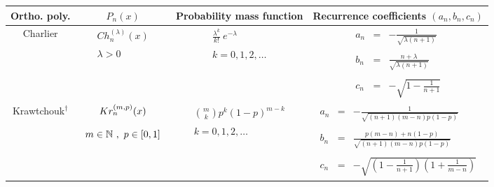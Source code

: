 {  \begin{center}

    \begin{tabular}{|c|c|c|c|}
      \hline
      Ortho. poly. &  $P_n(x)$ &  Probability mass function                                   &  Recurrence coefficients $(a_n,b_n,c_n)$   \\
      \hline\hline
      Charlier  &  $\begin{array}{c} Ch^{(\lambda)}_n(x) \\ \\ \lambda>0 \\ \end{array}$            &  $\begin{array}{c} \displaystyle{\frac{\lambda^k}{k!}~e^{-\lambda}} \\ \\ k=0,1,2,\dots \\ \end{array}$  &   $\begin{array}{ccc} a_n & = & - \frac{1}{\sqrt{\lambda (n+1)}} \\   \\  b_n & = & \frac{n+\lambda}{\sqrt{\lambda (n+1)}} \\ \\ c_n & = &  - \sqrt{1 - \frac{1}{n+1}} \end{array} $ \\
      \hline
      Krawtchouk$^{\dagger}$ & $\begin{array}{c} Kr^{(m,p)}_n(x) \\ \\ m \in {\mathbb N}~,~p \in [0,1] \\ \end{array}$ & $\begin{array}{c} \displaystyle{\binom{m}{k}p^k (1-p)^{m-k}} \\ \\ k=0,1,2,\dots \\ \end{array}$ & $\begin{array}{ccc} a_n & = & - \frac{1}{\sqrt{(n+1)(m-n)p(1-p)}} \\   \\  b_n & = & \frac{p(m-n)+n(1-p)}{\sqrt{(n+1)(m-n)p(1-p)}} \\ \\ c_n & = &  - \sqrt{(1 - \frac{1}{n+1})(1+\frac{1}{m-n})} \end{array} $ \\
      \hline


\end{tabular}
\end{center}}
